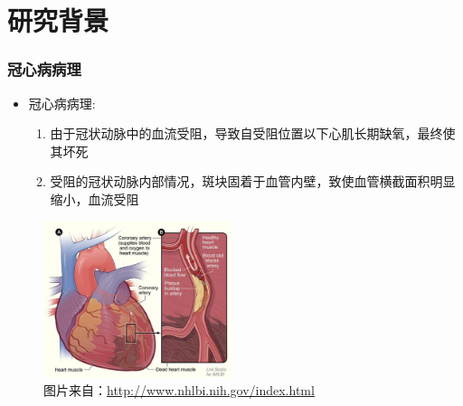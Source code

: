 \section{研究背景}

\begin{frame}
\frametitle{冠心病病理}
\begin{itemize}
  \item 冠心病病理: 
  \begin{enumerate}[A]
    \item 由于冠状动脉中的血流受阻，导致自受阻位置以下心肌长期缺氧，最终使其坏死
    \item 受阻的冠状动脉内部情况，斑块固着于血管内壁，致使血管横截面积明显缩小，血流受阻
  \end{enumerate}
\end{itemize}
\begin{figure}[t]
\centering
\includegraphics[height=130pt]{../../Figures/background/heart_attack_large.eps}
\caption[冠心病病理]{图片来自：\url{http://www.nhlbi.nih.gov/index.html}}
\end{figure}
\end{frame}

